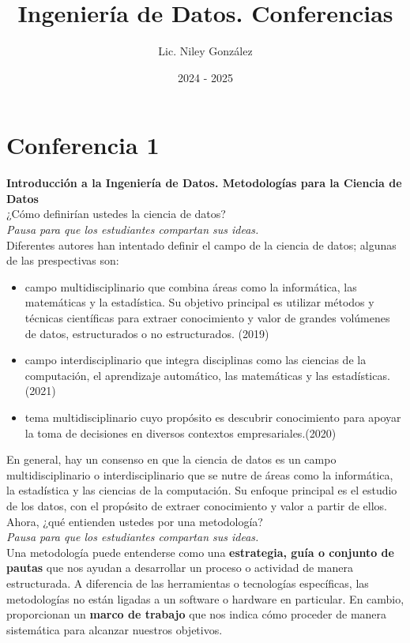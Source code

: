 \documentclass[12pt]{book}
\title{Ingeniería de Datos. Conferencias}
\author{Lic. Niley González}
\date{2024 - 2025}
\begin{document}
\maketitle

\chapter{Conferencia 1}
\normalfont\LARGE \textbf{Introducción a la Ingeniería de Datos. Metodologías para la Ciencia de Datos}
\normalfont\small\\

¿Cómo definirían ustedes la ciencia de datos?\\

\textit{Pausa para que los estudiantes compartan sus ideas.}\\

Diferentes autores han intentado definir el campo de la ciencia de datos; algunas de las prespectivas son:

\begin{itemize}
    \item campo multidisciplinario que combina áreas como la informática, las matemáticas y la estadística. Su objetivo principal es utilizar métodos y técnicas científicas para extraer conocimiento y valor de grandes volúmenes de datos, estructurados o no estructurados. (2019)
    \item campo interdisciplinario que integra disciplinas como las ciencias de la computación, el aprendizaje automático, las matemáticas y las estadísticas. (2021)
    \item tema multidisciplinario cuyo propósito es descubrir conocimiento para apoyar la toma de decisiones en diversos contextos empresariales.(2020)
\end{itemize}
En general, hay un consenso en que la ciencia de datos es un campo multidisciplinario o interdisciplinario que se nutre de áreas como la informática, la estadística y las ciencias de la computación. Su enfoque principal es el estudio de los datos, con el propósito de extraer conocimiento y valor a partir de ellos.\\

Ahora, ¿qué entienden ustedes por una metodología?\\

\textit{Pausa para que los estudiantes compartan sus ideas.}\\

Una metodología puede entenderse como una \textbf{estrategia, guía o conjunto de pautas} que nos ayudan a desarrollar un proceso o actividad de manera estructurada. A diferencia de las herramientas o tecnologías específicas, las metodologías no están ligadas a un software o hardware en particular. En cambio, proporcionan un \textbf{marco de trabajo} que nos indica cómo proceder de manera sistemática para alcanzar nuestros objetivos.
\end{document}
